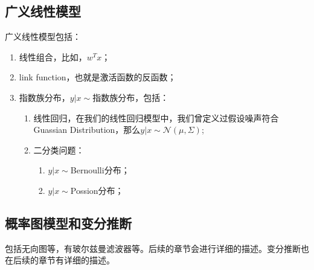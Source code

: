 \documentclass[a4paper]{article}
\begin{document}
\subsection{广义线性模型}
广义线性模型包括：
\begin{enumerate}[itemindent = 1em, itemsep = 0.4pt, parsep=0.5pt, topsep = 0.5pt]
\item 线性组合，比如，$w^Tx$；
\item link function，也就是激活函数的反函数；
\item 指数族分布，$y|x\sim$指数族分布，包括：
    \begin{enumerate}[itemindent = 1em, itemsep = 0.4pt, parsep=0.5pt, topsep = 0.5pt]
        \item 线性回归，在我们的线性回归模型中，我们曾定义过假设噪声符合Guassian Distribution，那么$y|x\sim\mathcal{N}(\mu, \Sigma)$;
        \item 二分类问题：
        \begin{enumerate}[itemindent = 1em, itemsep = 0.4pt, parsep=0.5pt, topsep = 0.5pt]
            \item $y|x\sim$Bernoulli分布；
            \item $y|x\sim$Possion分布；
        \end{enumerate}
    \end{enumerate}
\end{enumerate}

\subsection{概率图模型和变分推断}
包括无向图等，有玻尔兹曼滤波器等。后续的章节会进行详细的描述。变分推断也在后续的章节有详细的描述。
\end{document}
